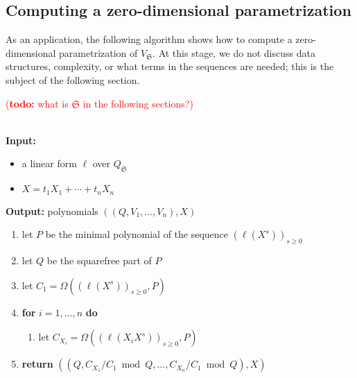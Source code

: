 \documentclass[12pt]{article}
\newcommand{\todo}[1]{\textcolor{red}{({\bf todo:} #1)}}
\newcommand{\minpoly}{P}
\newcommand{\lf}{X}
\begin{document}
\subsection{Computing a zero-dimensional parametrization}  

As an application, the following algorithm shows how to compute a
zero-dimensional parametrization of $V_{\mathfrak{S}}$. At this stage,
we do not discuss data structures, complexity, or what terms in the
sequences are needed; this is the subject of the following section.

\todo{what is $\mathfrak{S}$ in the following sections?}
\begin{algorithm}[H]
  \caption{$\mathsf{Parametrization}(\ell,\lf)$}  ~\\
	  {\bf Input:} \vspace{-0.5em}
	  \begin{itemize}\setlength\itemsep{0em}
	  \item  a linear form $\ell$ over $Q_\mathfrak{S}$
	  \item $\lf=t_1 X_1 + \cdots + t_n X_n$
	  \end{itemize}
	      {\bf Output:} polynomials $((Q,V_1,\dots,V_n),\lf)$
	      \begin{enumerate}\setlength\itemsep{0em}
	      \item let $\minpoly$ be the minimal polynomial of the sequence $(\ell(\lf^s))_{s \ge 0}$
	      \item let $Q$ be the squarefree part of $\minpoly$
	      \item let $C_1 = \Omega((\ell(\lf^s))_{s\ge0} ,\minpoly)$
	      \item \textbf{for} $i=1,\dots,n$ \textbf{do}
		\begin{enumerate}
		\item let $C_{X_i} = \Omega((\ell(X_i \lf^s))_{s\ge0}, \minpoly)$ 
		\end{enumerate}
	      \item \textbf{return} $((Q, C_{X_1}/ C_1 \bmod Q, \dots, C_{X_n}/ C_{1} \bmod Q),\lf)$
	      \end{enumerate}
	      \label{algo:para2}
\end{algorithm}
\end{document}
